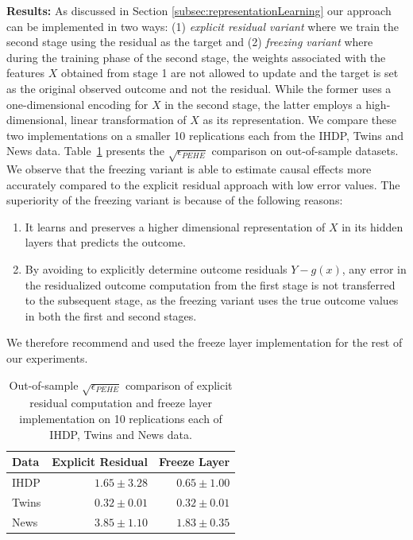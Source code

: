 \documentclass[sigconf]{acmart}
\newcommand{\eat}[1]{}
\theoremstyle{plain}
\numberwithin{equation}{section}
\begin{document}
\textbf{Results:} 
As discussed in Section \ref{subsec:representationLearning} our approach can be implemented in two ways: (1) \emph{explicit residual variant} where we train the second stage using the residual as the target and (2) \emph{freezing variant} where during the training phase of the second stage, the weights associated with the features $X$ obtained from stage 1 are not allowed to update and the target is set as the original observed outcome and not the residual. While the former uses a one-dimensional encoding for $X$ in the second stage, the latter employs a high-dimensional, linear transformation of $X$ as its representation. We compare these two implementations on a smaller 10 replications each from the IHDP, Twins and News data. Table~\ref{table:explictVsFreezingPEHE} presents the  $\sqrt{\epsilon_{PEHE}}$ comparison on out-of-sample datasets. We observe that the freezing variant is able to estimate causal effects more accurately compared to the explicit residual approach with low error values. The superiority of the freezing variant is because of the following reasons:
\begin{enumerate}[{(}1{)}]
    \item It learns and preserves a higher dimensional representation of $X$ in its hidden layers that predicts the outcome.
    \item By avoiding to explicitly determine outcome residuals $Y-g(x)$, any error in the residualized outcome computation from the first stage is not transferred to the subsequent stage, as the freezing variant uses the true outcome values in both the first and second stages.
\end{enumerate}
\eat{We reason that by avoiding the need to explicitly compute residual and by preserving a high dimension representation of $X$ that predicts the outcome, the freezing method results in better treatment effect estimation. }We therefore recommend and used the freeze layer implementation for the rest of our experiments.
\begin{center}
	\begin{table}[!ht]
		\centering
		\caption{Out-of-sample $\sqrt{\epsilon_{PEHE}}$ comparison of explicit residual computation and freeze layer implementation on 10 replications each of IHDP, Twins and News data. }
		\label{table:explictVsFreezingPEHE}
		\begin{tabular}{|l|r|r|}
			\hline
			Data & Explicit Residual & Freeze Layer\\
			\hline
			IHDP &   $1.65\pm3.28$  & $\bm{0.65}\pm1.00$ \\
			Twins &   $0.32\pm0.01$  & $\bm{0.32}\pm0.01$ \\
			News &   $3.85\pm1.10$ & $\bm{1.83}\pm0.35$ \\
			\hline		
		\end{tabular}
	\end{table}
\end{center}
\end{document}
